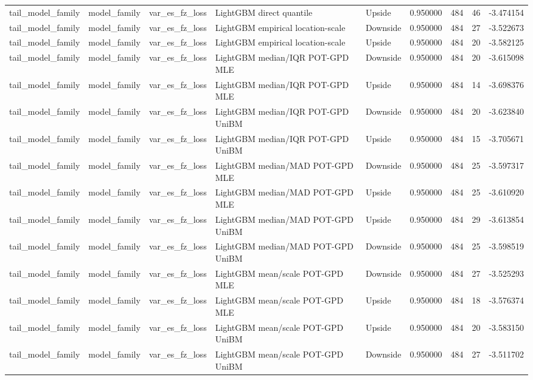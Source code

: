 \begin{tabular}{lllllrrr}
tail\_model\_family & model\_family & var\_es\_fz\_loss & LightGBM direct quantile & Upside & 0.950000 & 484 & 46 & -3.474154 \\
tail\_model\_family & model\_family & var\_es\_fz\_loss & LightGBM empirical location-scale & Downside & 0.950000 & 484 & 27 & -3.522673 \\
tail\_model\_family & model\_family & var\_es\_fz\_loss & LightGBM empirical location-scale & Upside & 0.950000 & 484 & 20 & -3.582125 \\
tail\_model\_family & model\_family & var\_es\_fz\_loss & LightGBM median/IQR POT-GPD MLE & Downside & 0.950000 & 484 & 20 & -3.615098 \\
tail\_model\_family & model\_family & var\_es\_fz\_loss & LightGBM median/IQR POT-GPD MLE & Upside & 0.950000 & 484 & 14 & -3.698376 \\
tail\_model\_family & model\_family & var\_es\_fz\_loss & LightGBM median/IQR POT-GPD UniBM & Downside & 0.950000 & 484 & 20 & -3.623840 \\
tail\_model\_family & model\_family & var\_es\_fz\_loss & LightGBM median/IQR POT-GPD UniBM & Upside & 0.950000 & 484 & 15 & -3.705671 \\
tail\_model\_family & model\_family & var\_es\_fz\_loss & LightGBM median/MAD POT-GPD MLE & Downside & 0.950000 & 484 & 25 & -3.597317 \\
tail\_model\_family & model\_family & var\_es\_fz\_loss & LightGBM median/MAD POT-GPD MLE & Upside & 0.950000 & 484 & 25 & -3.610920 \\
tail\_model\_family & model\_family & var\_es\_fz\_loss & LightGBM median/MAD POT-GPD UniBM & Upside & 0.950000 & 484 & 29 & -3.613854 \\
tail\_model\_family & model\_family & var\_es\_fz\_loss & LightGBM median/MAD POT-GPD UniBM & Downside & 0.950000 & 484 & 25 & -3.598519 \\
tail\_model\_family & model\_family & var\_es\_fz\_loss & LightGBM mean/scale POT-GPD MLE & Downside & 0.950000 & 484 & 27 & -3.525293 \\
tail\_model\_family & model\_family & var\_es\_fz\_loss & LightGBM mean/scale POT-GPD MLE & Upside & 0.950000 & 484 & 18 & -3.576374 \\
tail\_model\_family & model\_family & var\_es\_fz\_loss & LightGBM mean/scale POT-GPD UniBM & Upside & 0.950000 & 484 & 20 & -3.583150 \\
tail\_model\_family & model\_family & var\_es\_fz\_loss & LightGBM mean/scale POT-GPD UniBM & Downside & 0.950000 & 484 & 27 & -3.511702 \\

\end{tabular}
